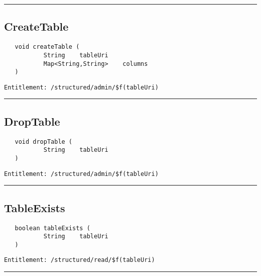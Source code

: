\rule{12cm}{2pt}
\subsection{CreateTable}
\label{Api:CreateTable}
\begin{Verbatim}
   void createTable (
           String    tableUri
           Map<String,String>    columns
   )
\end{Verbatim}
\begin{Verbatim}[formatcom=\color{Maroon}]
  Entitlement: /structured/admin/$f(tableUri)
\end{Verbatim}



\rule{12cm}{2pt}
\subsection{DropTable}
\label{Api:DropTable}
\begin{Verbatim}
   void dropTable (
           String    tableUri
   )
\end{Verbatim}
\begin{Verbatim}[formatcom=\color{Maroon}]
  Entitlement: /structured/admin/$f(tableUri)
\end{Verbatim}



\rule{12cm}{2pt}
\subsection{TableExists}
\label{Api:TableExists}
\begin{Verbatim}
   boolean tableExists (
           String    tableUri
   )
\end{Verbatim}
\begin{Verbatim}[formatcom=\color{Maroon}]
  Entitlement: /structured/read/$f(tableUri)
\end{Verbatim}



\rule{12cm}{2pt}

